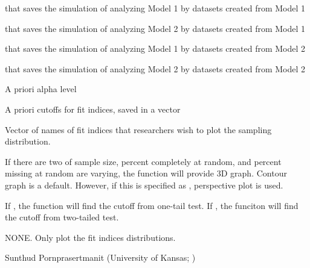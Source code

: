 \documentclass[a4paper]{book}
\begin{document}
\begin{Arguments}
\begin{ldescription}
\item[\code{dat1Mod1}] 
 that saves the simulation of analyzing Model 1 by datasets created from Model 1

\item[\code{dat1Mod2}] 
 that saves the simulation of analyzing Model 2 by datasets created from Model 1

\item[\code{dat2Mod1}] 
 that saves the simulation of analyzing Model 1 by datasets created from Model 2

\item[\code{dat2Mod2}] 
 that saves the simulation of analyzing Model 2 by datasets created from Model 2

\item[\code{alpha}] 
A priori alpha level

\item[\code{cutoff}] 
A priori cutoffs for fit indices, saved in a vector

\item[\code{usedFit}] 
Vector of names of fit indices that researchers wish to plot the sampling distribution. 

\item[\code{useContour}] 
If there are two of sample size, percent completely at random, and percent missing at random are varying, the  function will provide 3D graph. Contour graph is a default. However, if this is specified as , perspective plot is used.

\item[\code{onetailed}] 
If , the function will find the cutoff from one-tail test. If , the funciton will find the cutoff from two-tailed test.

\end{ldescription}
\end{Arguments}
%
\begin{Value}
NONE. Only plot the fit indices distributions.
\end{Value}
%
\begin{Author}\relax
Sunthud Pornprasertmanit (University of Kansas; )
\end{Author}
%
\end{document}
